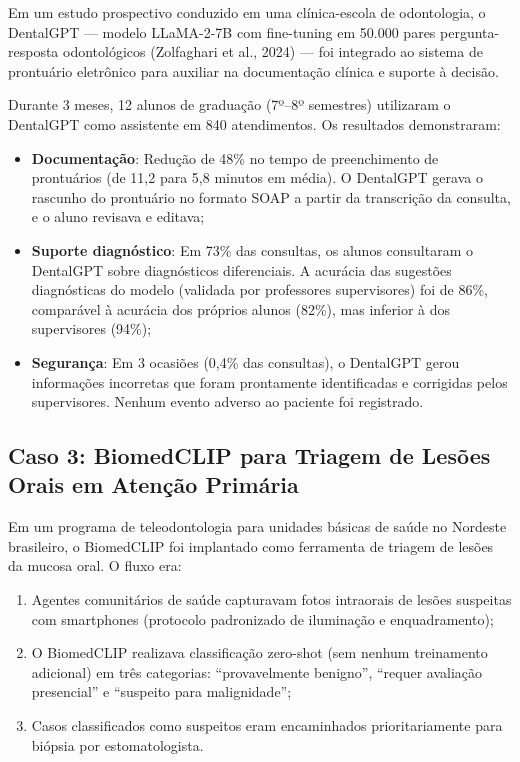 Em um estudo prospectivo conduzido em uma clínica-escola de odontologia, o DentalGPT --- modelo LLaMA-2-7B com fine-tuning em 50.000 pares pergunta-resposta odontológicos (Zolfaghari et al., 2024) --- foi integrado ao sistema de prontuário eletrônico para auxiliar na documentação clínica e suporte à decisão.

Durante 3 meses, 12 alunos de graduação (7º--8º semestres) utilizaram o DentalGPT como assistente em 840 atendimentos. Os resultados demonstraram:

\begin{itemize}
    \item \textbf{Documentação}: Redução de 48\% no tempo de preenchimento de prontuários (de 11,2 para 5,8 minutos em média). O DentalGPT gerava o rascunho do prontuário no formato SOAP a partir da transcrição da consulta, e o aluno revisava e editava;

    \item \textbf{Suporte diagnóstico}: Em 73\% das consultas, os alunos consultaram o DentalGPT sobre diagnósticos diferenciais. A acurácia das sugestões diagnósticas do modelo (validada por professores supervisores) foi de 86\%, comparável à acurácia dos próprios alunos (82\%), mas inferior à dos supervisores (94\%);

    \item \textbf{Segurança}: Em 3 ocasiões (0,4\% das consultas), o DentalGPT gerou informações incorretas que foram prontamente identificadas e corrigidas pelos supervisores. Nenhum evento adverso ao paciente foi registrado.
\end{itemize}


\subsection{Caso 3: BiomedCLIP para Triagem de Lesões Orais em Atenção Primária}

Em um programa de teleodontologia para unidades básicas de saúde no Nordeste brasileiro, o BiomedCLIP foi implantado como ferramenta de triagem de lesões da mucosa oral. O fluxo era:
\begin{enumerate}
    \item Agentes comunitários de saúde capturavam fotos intraorais de lesões suspeitas com smartphones (protocolo padronizado de iluminação e enquadramento);
    \item O BiomedCLIP realizava classificação zero-shot (sem nenhum treinamento adicional) em três categorias: ``provavelmente benigno'', ``requer avaliação presencial'' e ``suspeito para malignidade'';
    \item Casos classificados como suspeitos eram encaminhados prioritariamente para biópsia por estomatologista.
\end{enumerate}

